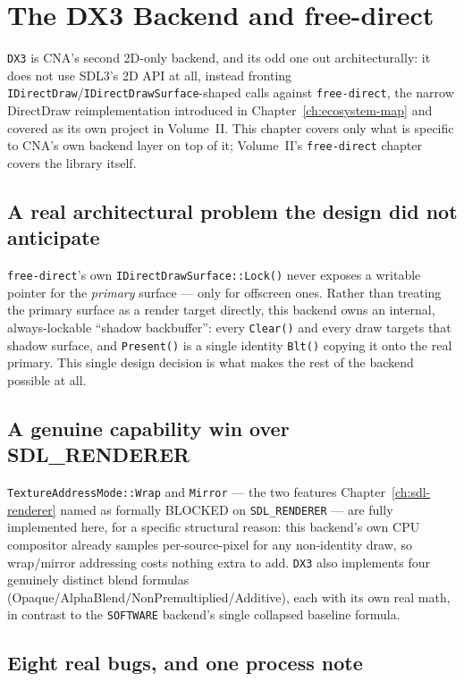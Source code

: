 \chapter{The DX3 Backend and free-direct}
\label{ch:dx3-freedirect-backend}

\texttt{DX3} is CNA's second 2D-only backend, and its odd one out architecturally: it does
not use SDL3's 2D API at all, instead fronting \texttt{IDirectDraw}/\texttt{IDirectDrawSurface}-shaped
calls against \texttt{free-direct}, the narrow DirectDraw reimplementation introduced in
Chapter~\ref{ch:ecosystem-map} and covered as its own project in Volume~II. This chapter
covers only what is specific to CNA's own backend layer on top of it; Volume~II's
\texttt{free-direct} chapter covers the library itself.

\section{A real architectural problem the design did not anticipate}

\texttt{free-direct}'s own \texttt{IDirectDrawSurface::Lock()} never exposes a writable
pointer for the \emph{primary} surface --- only for offscreen ones. Rather than treating the
primary surface as a render target directly, this backend owns an internal, always-lockable
``shadow backbuffer'': every \texttt{Clear()} and every  draw targets
that shadow surface, and \texttt{Present()} is a single identity \texttt{Blt()} copying it
onto the real primary. This single design decision is what makes the rest of the backend
possible at all.

\section{A genuine capability win over SDL\_RENDERER}

\texttt{TextureAddressMode::Wrap} and \texttt{Mirror} --- the two features
Chapter~\ref{ch:sdl-renderer} named as formally BLOCKED on \texttt{SDL\_RENDERER} --- are
fully implemented here, for a specific structural reason: this backend's own CPU compositor
already samples per-source-pixel for any non-identity draw, so wrap/mirror addressing costs
nothing extra to add. \texttt{DX3} also implements four genuinely distinct blend formulas
(Opaque/AlphaBlend/NonPremultiplied/Additive), each with its own real math, in contrast to
the \texttt{SOFTWARE} backend's single collapsed baseline formula.

\section{Eight real bugs, and one process note}

